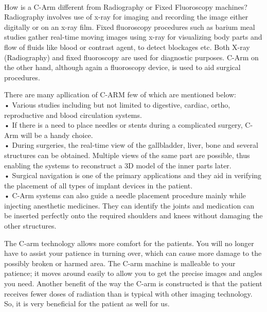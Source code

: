 \documentclass[12pt]{article}
\begin{document}
\\

How is a C-Arm different from Radiography or Fixed Fluoroscopy machines?
\\
Radiography involves use of x-ray for imaging and recording the image either digitally or on an x-ray film. Fixed fluoroscopy procedures such as barium meal studies gather real-time moving images using x-ray for visualizing body parts and flow of fluids like blood or contrast agent, to detect blockages etc. Both X-ray (Radiography) and fixed fluoroscopy are used for diagnostic purposes. C-Arm on the other hand, although again a fluoroscopy device, is used to aid surgical procedures.

\indent

There are many apllication of C-ARM few of which are mentioned below:
\\
•	Various studies including but not limited to digestive, cardiac, ortho, reproductive and blood circulation systems.
\\
•	If there is a need to place needles or stents during a complicated surgery, C-Arm will be a handy choice.
\\
•	During surgeries, the real-time view of the gallbladder, liver, bone and several structures can be obtained. Multiple views of the same part are possible, thus enabling the systems to reconstruct a 3D model of the inner parts later.
\\
•	Surgical navigation is one of the primary applications and they aid in verifying the placement of all types of implant devices in the patient.
\\
•	C-Arm systems can also guide a needle placement procedure mainly while injecting anesthetic medicines. They can identify the joints and medication can be inserted perfectly onto the required shoulders and knees without damaging the other structures.

\indent

The C-arm technology allows more comfort for the patients. You will no longer have to assist your patience in turning over, which can cause more damage to the possibly broken or harmed area. The C-arm machine is malleable to your patience; it moves around easily to allow you to get the precise images and angles you need. Another benefit of the way the C-arm is constructed is that the patient receives fewer doses of radiation than is typical with other imaging technology.
\\
So, it is very beneficial for the patient as well for us.
\end{document}
